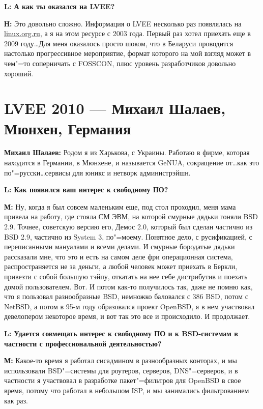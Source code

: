 \documentclass[10pt, a5paper]{article}
\begin{document}
{\noindent \bf L: А как ты оказался на LVEE?}

{\noindent \bf Н:} Это довольно сложно. Информация о LVEE несколько раз появлялась на \url{linux.org.ru}, а я на этом ресурсе с 2003 года. 
Первый раз хотел приехать еще в 2009 году\ldots Для меня оказалось просто шоком, что в Беларуси проводится настолько прогрессивное мероприятие, формат которого на мой взгляд может в чем"=то соперничать с FOSSCON, плюс уровень разработчиков довольно хороший. 

\section*{\flushleft LVEE 2010 --- Михаил Шалаев, \linebreak Мюнхен, Германия}


{\noindent \bf Михаил Шалаев:} Родом я из Харькова, с Украины. Работаю в фирме, которая находится в Германии, в Мюнхене, и называется GeNUA, сокращение от\ldots  как это по"=русски\ldots сервисы для юникс и нетворк администрэйшн.

{\noindent \bf L: Как появился ваш интерес к свободному ПО?}

{\noindent \bf М:} Ну, когда я был совсем маленьким еще, под стол проходил, меня мама привела на работу, где стояла СМ ЭВМ, на которой смурные дядьки гоняли BSD 2.9. Точнее, советскую версию его, Демос 2.0, который был сделан частично из BSD 2.9, частично из System 3, по"=моему. Понятное дело, с русификацией, с переписанными мануалами и всеми делами. И смурные бородатые дядьки рассказали мне, что это и есть на самом деле фри операционная система, распространяется не за деньги, а любой человек может приехать в Беркли, привезти с собой большую тэйпу, откатать на нее себе дистрибутив и поехать домой пользователем. Вот. И потом как-то получилось так, даже не помню как, что я пользовал разнообразные BSD, немножко баловался с 386 BSD, потом с NetBSD, а потом в 95-м году образовался проект OpenBSD, я в нем участвовал девелопером некоторое время, и вот так это все и происходило. И продолжает.

{\noindent \bf L:  Удается совмещать интерес к свободному ПО и к BSD-системам в частности с профессиональной деятельностью?}

{\noindent \bf М:} Какое-то время я работал сисадмином в разнообразных конторах, и мы использовали BSD"=системы для роутеров, серверов, DNS"=серверов, и в частности я участвовал в разработке пакет"=фильтров для OpenBSD в свое время, потому что работал в небольшом ISP, и мы занимались фильтрованием как раз. 
\end{document}
